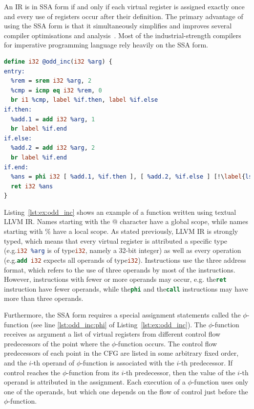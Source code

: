 An IR is in SSA form if and only if each virtual register is assigned exactly once and every use of registers occur after their definition.
The primary advantage of using the SSA form is that it simultaneously simplifies and improves several compiler optimisations and analysis~\citep{alpern88,cytron91}.
Most of the industrial-strength compilers for imperative programming language rely heavily on the SSA form.

\begin{lstlisting}[language=llvm,style=nasm,caption={An illustrative example of a function in textual LLVM IR. This function returns the argument incremented by one if it is even or by two if it is an odd integer.}, label={lst:ex:odd_inc}]
define i32 @odd_inc(i32 %arg) {
entry:
  %rem = srem i32 %arg, 2
  %cmp = icmp eq i32 %rem, 0
  br i1 %cmp, label %if.then, label %if.else
if.then:
  %add.1 = add i32 %arg, 1
  br label %if.end
if.else:
  %add.2 = add i32 %arg, 2
  br label %if.end
if.end:
  %ans = phi i32 [ %add.1, %if.then ], [ %add.2, %if.else ] [!\label{lst:odd_inc:phi}!]
  ret i32 %ans
}
\end{lstlisting}

Listing~\ref{lst:ex:odd_inc} shows an example of a function written using textual LLVM IR.
Names starting with the @ character have a global scope, while names starting with \% have a local scope.
As stated previously, LLVM IR is strongly typed, which means that every virtual register is attributed a specific type (e.g.\lstinline[language=llvm,style=nasm]{i32 %arg} is of type\lstinline[language=llvm,style=nasm]{i32}, namely a 32-bit integer) as well as every operation (e.g.\lstinline[language=llvm,style=nasm]{add i32} expects all operands of type\lstinline[language=llvm,style=nasm]{i32}).
Instructions use the three address format, which refers to the use of three operands by most of the instructions.
However, instructions with fewer or more operands may occur, e.g. the\lstinline[language=llvm,style=nasm]{ret} instruction have fewer operands, while the\lstinline[language=llvm,style=nasm]{phi} and the\lstinline[language=llvm,style=nasm]{call} instructions may have more than three operands.

Furthermore, the SSA form requires a special assignment statements called the $\phi$-function (see line \ref{lst:odd_inc:phi} of Listing~\ref{lst:ex:odd_inc}).
The $\phi$-function receives as argument a list of virtual registers from different  control flow predecessors of the point where the $\phi$-function occurs.
The control flow predecessors of each point in the CFG are listed in some arbitrary fixed order, and the $i$-th operand of $\phi$-function is associated with the $i$-th predecessor.
If control reaches the $\phi$-function from its $i$-th predecessor, then the value of the $i$-th operand is attributed in the assignment.
Each execution of a $\phi$-function uses only one of the operands, but which one depends on the flow of control just before the $\phi$-function.

